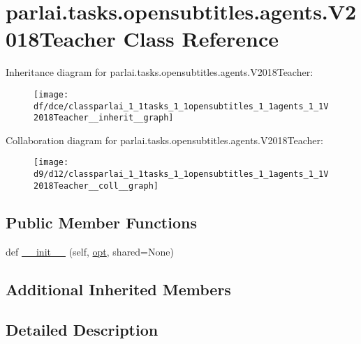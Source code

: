\hypertarget{classparlai_1_1tasks_1_1opensubtitles_1_1agents_1_1V2018Teacher}{}\section{parlai.\+tasks.\+opensubtitles.\+agents.\+V2018\+Teacher Class Reference}
\label{classparlai_1_1tasks_1_1opensubtitles_1_1agents_1_1V2018Teacher}


Inheritance diagram for parlai.\+tasks.\+opensubtitles.\+agents.\+V2018\+Teacher\+:\nopagebreak
\begin{figure}[H]
\begin{center}
\leavevmode
\texttt{[image: df/dce/classparlai\_1\_1tasks\_1\_1opensubtitles\_1\_1agents\_1\_1V2018Teacher\_\_inherit\_\_graph]}
\end{center}
\end{figure}


Collaboration diagram for parlai.\+tasks.\+opensubtitles.\+agents.\+V2018\+Teacher\+:\nopagebreak
\begin{figure}[H]
\begin{center}
\leavevmode
\texttt{[image: d9/d12/classparlai\_1\_1tasks\_1\_1opensubtitles\_1\_1agents\_1\_1V2018Teacher\_\_coll\_\_graph]}
\end{center}
\end{figure}
\subsection*{Public Member Functions}
\begin{DoxyCompactItemize}
\item 
def \hyperlink{classparlai_1_1tasks_1_1opensubtitles_1_1agents_1_1V2018Teacher_a10803c76b3b6467a673659099d90d777}{\+\_\+\+\_\+init\+\_\+\+\_\+} (self, \hyperlink{classparlai_1_1core_1_1teachers_1_1FbDialogTeacher_af7a9ec497b9cd0292d7b8fa220da7c28}{opt}, shared=None)
\end{DoxyCompactItemize}
\subsection*{Additional Inherited Members}


\subsection{Detailed Description}


